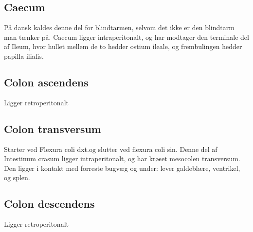 	\subsection{Caecum}
	På dansk kaldes denne del for blindtarmen, selvom det ikke er den blindtarm man tænker på. Caecum ligger intraperitonalt, og har modtager den terminale del af Ileum, hvor hullet mellem de to hedder ostium ileale, og frembulingen hedder papilla ilialis.
	
	\subsection{Colon ascendens}
	Ligger retroperitonalt
	
	\subsection{Colon transversum}
	Starter ved Flexura coli dxt.og slutter ved flexura coli sin. Denne del af Intestinum crasum ligger intraperitonalt, og har krøset mesocolen transversum. Den ligger i kontakt med forreste bugvæg og under: lever galdeblære, ventrikel, og splen.
	
	\subsection{Colon descendens}
	Ligger retroperitonalt
	
	\pagebreak
	
